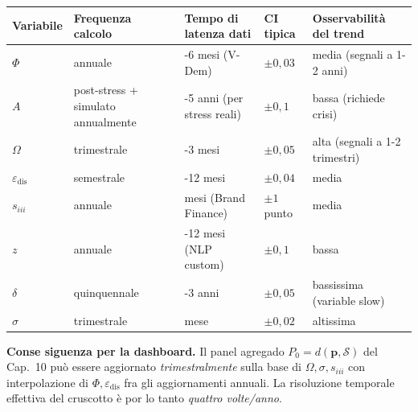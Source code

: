 {\def\LTcaptype{none} %
{\small\begin{longtable}[]{@{}
  >{\raggedright\arraybackslash}p{}
  >{\raggedright\arraybackslash}p{}
  >{\raggedright\arraybackslash}p{}
  >{\raggedright\arraybackslash}p{}
  >{\raggedright\arraybackslash}p{}@{}}
\toprule\noalign{}
\begin{minipage}[b]{\linewidth}\raggedright
Variabile
\end{minipage} & \begin{minipage}[b]{\linewidth}\raggedright
Frequenza calcolo
\end{minipage} & \begin{minipage}[b]{\linewidth}\raggedright
Tempo di latenza dati
\end{minipage} & \begin{minipage}[b]{\linewidth}\raggedright
CI tipica
\end{minipage} & \begin{minipage}[b]{\linewidth}\raggedright
Osservabilità del trend
\end{minipage} \\
\midrule\noalign{}
\endhead
\bottomrule\noalign{}
\endlastfoot
\(\Phi\) & annuale & 4-6 mesi (V-Dem) & \(\pm 0{,}03\) & media (segnali
a 1-2 anni) \\
\(A\) & post-stress + simulato annualmente & 3-5 anni (per stress reali)
& \(\pm 0{,}1\) & bassa (richiede crisi) \\
\(\Omega\) & trimestrale & 2-3 mesi & \(\pm 0{,}05\) & alta (segnali a
1-2 trimestri) \\
\(\varepsilon_{\text{dis}}\) & semestrale & 6-12 mesi & \(\pm 0{,}04\) &
media \\
\(s_{iii}\) & annuale & 3 mesi (Brand Finance) & \(\pm 1\) punto &
media \\
\(z\) & annuale & 6-12 mesi (NLP custom) & \(\pm 0{,}1\) & bassa \\
\(\delta\) & quinquennale & 1-3 anni & \(\pm 0{,}05\) & bassissima
(variable slow) \\
\(\sigma\) & trimestrale & 1 mese & \(\pm 0{,}02\) & altissima \\
\end{longtable}}
}

\Hypoth{} \textbf{Conse siguenza per la dashboard.} Il panel agregado
\(P_0 = d(\boldsymbol{p}, \mathcal{S})\) del Cap.~10 può essere
aggiornato \emph{trimestralmente} sulla base di
\(\Omega, \sigma, s_{iii}\) con interpolazione di
\(\Phi, \varepsilon_{\text{dis}}\) fra gli aggiornamenti annuali. La
risoluzione temporale effettiva del cruscotto è por lo tanto \emph{quattro
volte/anno}.



